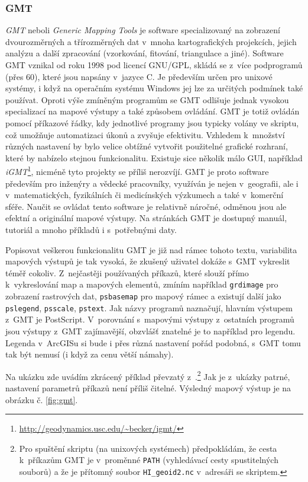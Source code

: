 \documentclass[a4paper,12pt,draft]{article}
\begin{document}
\subsubsection{GMT}
\label{sec:porovnani:gmt}
\emph{GMT} neboli \emph{Generic Mapping Tools} \cite{GMT} je software
specializovaný na zobrazení dvourozměrných a třírozměrných dat v~mnoha
kartografických projekcích, jejich
analýzu a další zpracování (vzorkování, fitování, triangulace a jiné). Software
GMT vznikal od roku 1998 pod licencí GNU/GPL, skládá se z~více podprogramů (přes
60), které jsou napsány v~jazyce C. Je především určen pro unixové systémy, i
když na operačním systému Windows jej lze za určitých podmínek také používat. 
Oproti výše zmíněným programům se GMT odlišuje jednak vysokou specializací na
mapové výstupy a také způsobem ovládání. GMT je totiž ovládán pomocí příkazové
řádky, kdy jednotlivé programy jsou typicky volány ve skriptu, což umožňuje
automatizaci úkonů a zvyšuje efektivitu. Vzhledem k~množství různých nastavení
by bylo velice obtížné vytvořit použitelné grafické rozhraní, které by nabízelo
stejnou funkcionalitu. Existuje sice několik málo GUI, například
\emph{iGMT}\footnote{\url{http://geodynamics.usc.edu/~becker/igmt/}}, nicméně
tyto projekty se příliš nerozvíjí. GMT je proto software především pro
inženýry a vědecké pracovníky, využíván je nejen v~geografii, ale i
v~matematických, fyzikálních či medicínských výzkumech a také v~komerční sféře.
Naučit se ovládat tento software je relativně náročné, odměnou jsou ale
efektní a originální mapové výstupy. Na stránkách GMT \cite{GMT} je dostupný
manuál, tutoriál a mnoho příkladů i s~potřebnými daty.

Popisovat veškerou funkcionalitu GMT je již nad rámec tohoto textu, variabilita
mapových výstupů je tak vysoká, že zkušený uživatel dokáže s~GMT vykreslit
téměř cokoliv. Z~nejčastěji používaných příkazů, které slouží přímo
k~vykreslování map a mapových elementů, zmíním například \verb|grdimage| pro
zobrazení rastrových dat, \verb|psbasemap| pro mapový rámec a existují další
jako \verb|pslegend|, \verb|psscale|, \verb|pstext|. Jak názvy programů
naznačují, hlavním výstupem z~GMT je PostScript.
V~porovnání s~mapovými výstupy z~ostatních programů jsou výstupy z~GMT
zajímavější, obzvlášť znatelné je to například pro legendu. Legenda v~ArcGISu si
bude i přes různá nastavení pořád podobná, s~GMT tomu tak být nemusí (i když za
cenu větší námahy).

Na ukázku zde uvádím zkrácený příklad převzatý z~\cite[příklad č.
2]{GMT}.\footnote{Pro spuštění skriptu (na unixových systémech) předpokládám, že
cesta k~příkazům GMT je v~proměnné \texttt{PATH} (vyhledávací cesty
spustitelných souborů) a že je přítomný soubor \texttt{HI\_geoid2.nc}
v~adresáři se skriptem.} Jak je z~ukázky patrné, nastavení parametrů příkazů
není příliš čitelné. Výsledný mapový výstup je na obrázku č. \ref{fig:gmt}. 
 
\end{document}
